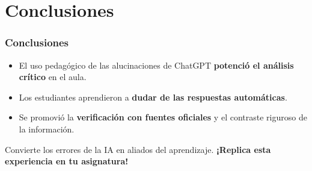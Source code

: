\section{Conclusiones}

\begin{frame}
    \frametitle{Conclusiones}

    \begin{itemize}
        \item El uso pedagógico de las alucinaciones de ChatGPT \textbf{potenció el análisis crítico} en el aula.
        \item Los estudiantes aprendieron a \textbf{dudar de las respuestas automáticas}.
        \item Se promovió la \textbf{verificación con fuentes oficiales} y el contraste riguroso de la información.
    \end{itemize}

    \pause
    \vspace{0.4cm}
    \begin{block}{}
    Convierte los errores de la IA en aliados del aprendizaje. \textbf{¡Replica esta experiencia en tu asignatura!}
    \end{block}
\end{frame}

